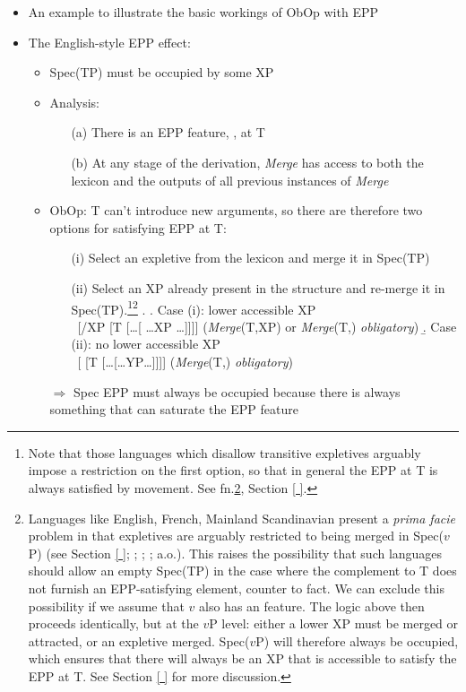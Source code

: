 \documentclass[letterpaper,10pt]{handout_nick}
\begin{document}
\begin{itemize}
\item An example to illustrate the basic workings of ObOp with EPP 
\item The English-style EPP effect: 
\begin{itemize}
\item Spec(TP) must be occupied by some XP
\item Analysis: 
\begin{itemize}
\item[(a)] There is an EPP feature, , at T
\item[(b)] At any stage of the derivation, \emph{Merge} has access to both the lexicon and the outputs of all previous instances of \emph{Merge}
\end{itemize}
\item ObOp: T can't introduce new arguments, so there are therefore two options for satisfying EPP at T:
\begin{itemize}
\item[(i)] Select an expletive from the lexicon and merge it in Spec(TP) 
\item[(ii)] Select an XP already present in the structure and re-merge it in Spec(TP).\footnote{\label{transexp}Note that those languages which disallow transitive expletives arguably impose a restriction on the first option, so that in general the EPP at T is always satisfied by movement. See fn.\ref{expl1}, Section \ref{ }.}\footnote{\label{expl1} Languages like English, French, Mainland Scandinavian present a \emph{prima facie} problem in that expletives are arguably restricted to being merged in Spec($v$P) (see Section \ref{ }; \citealt{richards06}; \citealt{deal09}; \citealt{wu}; a.o.). This raises the possibility that such languages should allow an empty Spec(TP) in the case where the complement to T does not furnish an EPP-satisfying element, counter to fact. We can exclude this possibility if we assume that $v$ also has an  feature. The logic above then proceeds identically, but at the $v$P level: either a lower XP must be merged or attracted, or an expletive merged. Spec($v$P) will therefore always be occupied, which ensures that there will always be an XP that is accessible to satisfy the EPP at T. See Section \ref{ } for more discussion.}  
\ex. \a. Case (i): lower accessible XP\\
\ [/XP [T [\ldots[ \ldots XP \ldots]]]] \hfill (\emph{Merge}(T,XP) or \emph{Merge}(T,) \emph{obligatory})
\b. Case (ii): no lower accessible XP\\
\ [ [T [\ldots[\ldots YP\ldots]]]] \hfill (\emph{Merge}(T,) \emph{obligatory})

\end{itemize}
\item[$\Rightarrow$] Spec EPP must always be occupied because there is always something that can saturate the EPP feature
\end{itemize}
\end{itemize}
\end{document}
